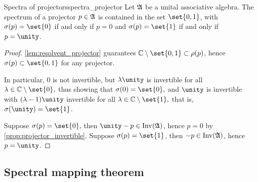 \begin{proposition}{Spectra of projectors}{spectra_projector}
    Let \(\mathfrak{A}\) be a unital associative algebra. The spectrum of a projector \(p \in \mathfrak{A}\) is contained in the set \(\set{0,1}\), with \(\sigma(p) = \set{0}\) if and only if \(p = 0\) and \(\sigma(p) = \set{1}\) if and only if \(p = \unity\).
\end{proposition}
\begin{proof}
    \cref{lem:resolvent_projector} guarantees \(\mathbb{C} \setminus \set{0,1}\subset \rho(p)\), hence \(\sigma(p) \subset \set{0,1}\) for any projector.

    In particular, \(0\) is not invertible, but \(\lambda \unity\) is invertible for all \(\lambda \in \mathbb{C} \setminus \set{0},\) thus showing that \(\sigma(0) = \set{0},\) and \(\unity\) is invertible with \((\lambda - 1)\unity\) invertible for all \(\lambda \in \mathbb{C}\setminus\set{1},\) that is, \(\sigma(\unity) = \set{1}\).

    Suppose \(\sigma(p) = \set{0},\) then \(\unity - p \in \invertible{\algebra{A}}\), hence \(p = 0\) by \cref{prop:projector_invertible}. Suppose \(\sigma(p) = \set{1}\), then \(-p \in \operatorname{Inv}(\mathfrak{A})\), hence \(p = \unity\).
\end{proof}
\subsection{Spectral mapping theorem}
